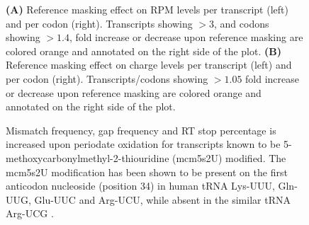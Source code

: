\begin{figure}[ht]
    \centering
    \caption[Reference masking effect on RPM and charge levels.]{
    \textbf{(A)} Reference masking effect on RPM levels per transcript (left) and per codon (right).
    Transcripts showing $>3$, and codons showing $>1.4$, fold increase or decrease upon reference masking are colored orange and annotated on the right side of the plot.
    \textbf{(B)} Reference masking effect on charge levels per transcript (left) and per codon (right).
    Transcripts/codons showing $>1.05$ fold increase or decrease upon reference masking are colored orange and annotated on the right side of the plot.
    }
    \label{ch5:figsupp:f3S1}
\end{figure}


\begin{figure}[ht]
    \centering
    \caption[Anticodon modification mcm5s2U is detected in periodate oxidized samples.]{
    Mismatch frequency, gap frequency and RT stop percentage is increased upon periodate oxidation for transcripts known to be 5-methoxycarbonylmethyl-2-thiouridine (mcm5s2U) modified.
    The mcm5s2U modification has been shown to be present on the first anticodon nucleoside (position 34) in human tRNA Lys-UUU, Gln-UUG, Glu-UUC and Arg-UCU, while absent in the similar tRNA Arg-UCG \cite{Lentini2018-xs}.
    }
    \label{ch5:figsupp:f3S2}
\end{figure}


